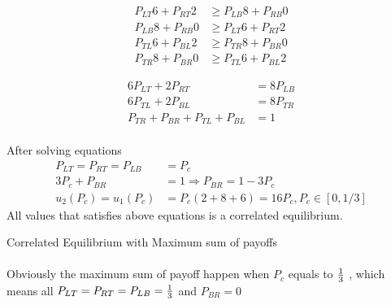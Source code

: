 \documentclass[
  course = {{IE579 Game Theory and Multi-Agent Reinforcement Learning}},
  assignment = 1,
  name = {{Mohammad Mahdi Rahimi}},
  studentnumber = {{20208244}},
  email = {{mahi@kaist.ac.kr}},
  firstexercise = 1
]{aga-homework}
\begin{document}
\begin{equation}
    \begin{split}
    P_{LT}6 + P_{RT}2 & \ge P_{LB}8 + P_{RB}0 \\
    P_{LB}8 + P_{RB}0 & \ge P_{LT}6 + P_{RT}2\\
    P_{TL}6 + P_{BL}2 & \ge P_{TR}8 + P_{BR}0 \\
    P_{TR}8 + P_{BR}0 & \ge P_{TL}6 + P_{BL}2
    \end{split}
\end{equation}

\begin{equation}
    \begin{split}
    6P_{LT} + 2P_{RT} & = 8P_{LB} \\
    6P_{TL} + 2P_{BL} & = 8P_{TR} \\
    P_{TR} + P_{BR} + P_{TL} + P_{BL} & = 1
    \end{split}
\end{equation}
\\
After solving equations
\\
\begin{equation}
    \begin{split}
    P_{LT} = P_{RT} = P_{LB} &= P_c\\
    3P_c + P_{BR}& = 1 \Rightarrow P_{BR} = 1 - 3P_c\\
    u_2(P_c) = u_1(P_c) &= P_c(2 + 8 + 6) = 16P_c, P_c \in [0, 1/3]
    \end{split}
\end{equation}
All values that satisfies above equations is a correlated equilibrium.

\subexercise Correlated Equilibrium with Maximum sum of payoffs
\\
\\
Obviously the maximum sum of payoff happen when $P_c$ equals to ${1 \over 3}$ , which means all $P_{LT} = P_{RT} = P_{LB} = {1 \over 3}$ and  $P_{BR} = 0$
\end{document}
